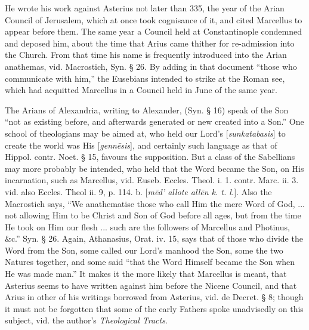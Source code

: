 He wrote his work against Asterius not later than
335, the year of the Arian Council of Jerusalem, which at once took
cognisance of it, and cited Marcellus to appear before them. The same
year a Council held at Constantinople condemned and deposed him, about
the time that Arius came thither for re-admission into the Church.
From that time his name is frequently introduced into the Arian
anathemas, vid. Macrostich, Syn. § 26. By adding in that document ``those
who communicate with him,'' the Eusebians intended to strike at the
Roman see, which had acquitted Marcellus in a Council held in June of
the same year.

The Arians of Alexandria, writing to Alexander, (Syn.
§ 16) speak of the Son ``not as existing before, and afterwards
generated or new created into a Son.'' One school of theologians may be
aimed at, who held our Lord's [\emph{sunkatabasis}] to create the
world was His [\emph{genn\={e}sis}], and certainly such language as
that of Hippol. contr. Noet. § 15, favours the supposition. But a
class of the Sabellians may more probably be intended, who held that
the Word became the Son, on His incarnation, such as Marcellus, vid.
Euseb. Eccles. Theol. i. 1. contr. Marc. ii. 3. vid. also Eccles.
Theol ii. 9, p. 114. b. [\emph{m\={e}d'
allote all\={e}n k. t. l.}]. Also the Macrostich says, ``We
anathematise those who call Him the mere Word of God, ... not allowing
Him to be Christ and Son of God before all ages, but from the time He
took on Him our flesh ... such are the followers of Marcellus and
Photinus, \&c.'' Syn. § 26. Again, Athanasius, Orat. iv. 15, says
that of those who divide the Word from the Son, some called our Lord's
manhood the Son, some the two Natures together, and some said ``that
the Word Himself became the Son when He was made man.'' It makes it the
more likely that Marcellus is meant, that Asterius seems to have
written against him before the Nicene Council, and that Arius in other
of his writings borrowed from Asterius, vid. de Decret. § 8; though
it must not be forgotten that some of the early Fathers spoke
unadvisedly on this subject, vid. the author's \emph{Theological Tracts}.


